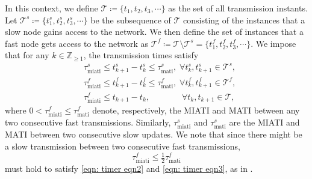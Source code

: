 In this context, we define $\mathcal{T} \coloneqq \{t_1, t_2, t_3, \cdots \}$ as the set of all transmission instants. Let $\mathcal{T}^s \coloneqq \{t_1^s, t_2^s, t_3^s, \cdots \}$ be the subsequence of $\mathcal{T}$ consisting of the instances that a slow node gains access to the network. We then define the set of instances that a fast node gets access to the network as $\mathcal{T}^f \coloneqq \mathcal{T} \setminus \mathcal{T}^s = \{t_1^f, t_2^f, t_3^f, \cdots \}$.
%
%
%
%
We impose that for any $k \in \mathbb{Z}_{\geq 1}$, the transmission times satisfy
\begin{subequations}
    \begin{align}
    &\tau_{\text{miati}}^s \leq t_{k+1}^s - t_k^s \leq \tau_{\text{mati}}^s, \; \forall t_k^s,t_{k+1}^s\in \mathcal{T}^s,  \label{eqn: timer eqn1}
    \\
    &\tau_{\text{miati}}^f \leq t_{k+1}^f - t_k^f \leq \tau_{\text{mati}}^f ,  \; \forall t_k^f, t_{k+1}^f  \in \mathcal{T}^f,  
    \label{eqn: timer eqn2}
    \\
    &\tau_{\text{miati}}^f \leq t_{k+1} - t_k, \quad \qquad \; \; \ \forall t_k, t_{k + 1} \in \mathcal{T}, \label{eqn: timer eqn3}
    \end{align}
    \label{eqn: Stefan timer}%
\end{subequations}
\noindent where $0<\tau_{\text{miati}}^f\leq \tau_{\text{mati}}^f$ denote, respectively, the MIATI and MATI between any two consecutive fast transmissions. Similarly, $\tau_{\text{miati}}^s$ and $\tau_{\text{mati}}^s$ are the MIATI and MATI between two consecutive slow updates.
We note that since there might be a slow transmission between two consecutive fast transmissions,
\begin{equation}
    \tau_{\text{miati}}^f \leq  \tfrac{1}{2}\tau_{\text{mati}}^f
    \label{eqn: condition on miati^f}
\end{equation}
must hold to satisfy \eqref{eqn: timer eqn2} and \eqref{eqn: timer eqn3}, as in \cite{Stefan_thesis}.


